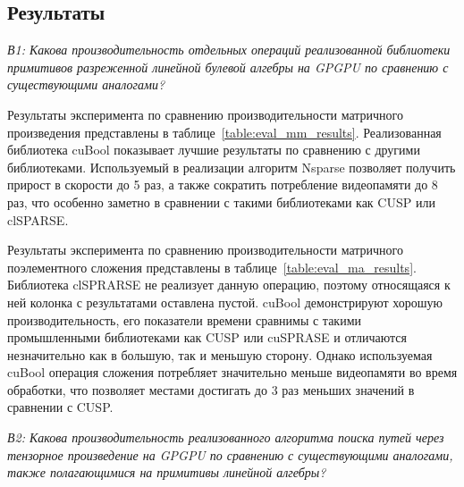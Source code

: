 \subsection{Результаты}


\textit{В1: Какова производительность отдельных операций реализованной библиотеки примитивов разреженной линейной булевой алгебры на GPGPU по сравнению с существующими аналогами?} 

Результаты эксперимента по сравнению производительности матричного произведения представлены в таблице~\ref{table:eval_mm_results}.
Реализованная библиотека cuBool показывает лучшие результаты по сравнению с другими библиотеками. 
Используемый в реализации алгоритм Nsparse позволяет получить прирост в скорости до 5 раз, а также сократить потребление видеопамяти до 8 раз, что особенно заметно в сравнении с такими библиотеками как CUSP или clSPARSE.

Результаты эксперимента по сравнению производительности матричного поэлементного сложения представлены в таблице~\ref{table:eval_ma_results}. 
Библиотека clSPRARSE не реализует данную операцию, поэтому относящаяся к ней колонка с результатами оставлена пустой.
cuBool демонстрируют хорошую производительность, его показатели времени сравнимы с такими промышленными библиотеками как CUSP или cuSPRASE и отличаются незначительно как в большую, так и меньшую сторону. 
Однако используемая cuBool операция сложения потребляет значительно меньше видеопамяти во время обработки, что позволяет местами достигать до 3 раз меньших значений в сравнении с CUSP.

\textit{В2: Какова производительность реализованного алгоритма поиска путей через тензорное произведение на GPGPU по сравнению с существующими аналогами, также полагающимися на примитивы линейной алгебры?}

